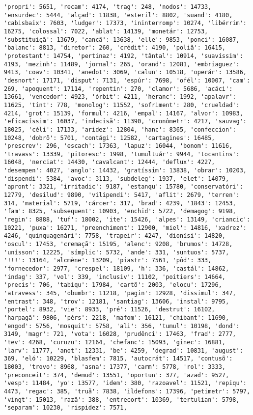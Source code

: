 \begin{Verbatim}[commandchars=\\\{\}]
'propri': 5651, 'recam': 4174, 'trag': 248, 'nodos': 14733, 'ensurdec': 5444, 'alçad': 11838, 'esteril': 8802, 'suand': 4180, 'cabisbaix': 7603, 'ludger': 17373, 'ininterromp': 10274, 'libérrim': 16275, 'colossal': 7022, 'ablat': 14139, 'monetár': 12753, 'substituiçã': 13679, 'cancã': 13638, 'elle': 9853, 'ponci': 16087, 'balanc': 8813, 'diretor': 260, 'crédit': 4190, 'poliã': 16415, 'protestant': 14754, 'pertinaz': 4192, 'tântal': 10914, 'suavíssim': 4193, 'mezinh': 11489, 'jornal': 265, 'orand': 12081, 'embriaguez': 9413, 'coav': 10341, 'anedot': 3069, 'calun': 10518, 'operár': 13586, 'desnort': 17171, 'disput': 7131, 'espúr': 7698, 'ofél': 10007, 'cam': 269, 'apoquent': 17114, 'repentin': 270, 'clamor': 5686, 'acáci': 13661, 'vencedor': 4923, 'órbit': 4211, 'heranc': 1992, 'apalavr': 11625, 'tint': 778, 'monolog': 11552, 'sofriment': 280, 'crueldad': 4214, 'grot': 15139, 'formul': 4216, 'empal': 14167, 'alvor': 10983, 'eficacíssim': 16037, 'indecisã': 11390, 'cronômetr': 4217, 'sauvag': 18025, 'céli': 17133, 'aridez': 12804, 'hanc': 8365, 'confeccion': 10248, 'dobrõ': 5701, 'contági': 12582, 'cartagines': 16485, 'prescrev': 296, 'escach': 17363, 'lapuz': 16044, 'bonom': 11616, 'travass': 13339, 'pitoresc': 1998, 'tumultuár': 9944, 'tocantins': 16048, 'nerciat': 14430, 'cavalcant': 12444, 'deflux': 4227, 'desempen': 4027, 'anglo': 14432, 'gratíssim': 13838, 'obrar': 10203, 'dispendi': 5384, 'avoc': 3113, 'subdeleg': 1937, 'elet': 14079, 'apront': 3321, 'irritadic': 9187, 'estanqu': 15780, 'conservatóri': 12779, 'desilud': 9890, 'vilipendi': 5417, 'aflit': 2679, 'terren': 314, 'material': 5719, 'cárcer': 317, 'brad': 4239, '1843': 12453, 'fam': 8325, 'subsequent': 10903, 'enchid': 5722, 'demagog': 9198, 'regin': 8888, 'tuf': 18002, 'ite': 15426, 'alpes': 13149, 'criancic': 10221, 'puxa': 16271, 'preenchiment': 12900, 'miel': 14816, 'xadrez': 4246, 'quinquagenári': 7758, 'trapeir': 4247, 'dionísi': 14820, 'oscul': 17453, 'cremaçã': 15195, 'alenc': 9208, 'brumos': 14728, 'unísson': 12225, 'símplic': 5732, 'ande': 331, 'suntuos': 5737, '!!!': 13164, 'alcmène': 13209, 'piastr': 7561, 'pôd': 333, 'fornecedor': 2977, 'crespel': 18109, 'h': 336, 'castál': 14862, 'indag': 337, 'vol': 339, 'inclusiv': 11102, 'poitiers': 14664, 'precis': 706, 'tabiqu': 17984, 'cartõ': 2003, 'elocu': 17296, 'atravess': 345, 'obumbr': 11218, 'pagin': 12928, 'dissimul': 347, 'entrast': 348, 'trov': 12181, 'santiag': 13606, 'instal': 9795, 'portel': 8932, 'vie': 8933, 'pré': 11526, 'destrut': 16102, 'harpagã': 9806, 'pérs': 2218, 'mafom': 16121, 'chibant': 11690, 'engod': 5756, 'mosquit': 5758, 'ali': 356, 'tumul': 10198, 'dond': 3149, 'magr': 721, 'vota': 16028, 'prudênci': 17463, 'frad': 2777, 'tev': 4268, 'curuzu': 12164, 'chefanc': 15093, 'ginec': 16881, 'larv': 11777, 'anot': 12331, 'be': 4259, 'degrad': 10831, 'august': 369, 'eló': 10229, 'blasfem': 7815, 'autocrát': 14517, 'contusõ': 18003, 'trovo': 8968, 'asna': 17377, 'carm': 5778, 'rol': 3333, 'preconceit': 374, 'demud': 13551, 'oportun': 377, 'azad': 9527, 'vesp': 11484, 'yo': 13577, 'idem': 380, 'razoavel': 11521, 'repiqu': 4473, 'regac': 385, 'truã': 7838, 'ildefons': 17396, 'petimetr': 5797, 'vingt': 15013, 'razã': 388, 'entrecort': 10369, 'tertulian': 5798, 'separam': 10230, 'rispidez': 7571, 
\end{Verbatim}
